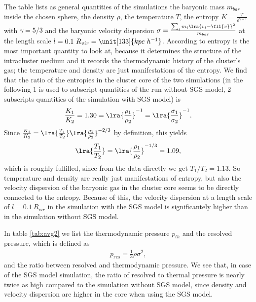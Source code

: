 The table lists as general quantities of the simulations the baryonic mass
$m_{bar}$ inside the chosen sphere, the density $\rho$, the temperature $T$, the
entropy $K=\frac{T}{\rho^{\gamma-1}}$ with $\gamma=5/3$ and the baryonic
velocity dispersion $\sigma= \frac{\sum_i m_i \lra{v_i -
\fil{v}}^2}{m_{bar}}$ at the length scale 
$l=0.1\ R_{vir}=\unit[133]{kpc\ h^{-1}}$. According to \citet{Voit2005} entropy
is the most important quantity to look at, because it determines
the structure of the intracluster medium and it records the thermodynamic
history of the cluster's gas; the temperature and density are just
manifestations of the entropy.
We find that the ratio of the entropies in the cluster core of the two
simulations (in the 
following 1 is used to subscript quantities of the run without SGS model, 2
subscripts quantities of the simulation with SGS model) is
\begin{align}
\frac{K_1}{K_2}=1.30 = \lra{\frac{\rho_1}{\rho_2}}^{-1}=
\lra{\frac{\sigma_1}{\sigma_2}}^{-1}.
\end{align}
Since $\frac{K_1}{K_2}=
\lra{\frac{T_1}{T_2}}\lra{\frac{\rho_1}{\rho_2}}^{-2/3}$ by definition, this
yields
\begin{align}
\lra{\frac{T_1}{T_2}}=\lra{\frac{\rho_1}{\rho_2}}^{-1/3}=1.09,
\end{align}
which is roughly fulfilled, since from the data directly
we get $T_1/T_2 = 1.13$. So temperature and density are really just
manifestations of entropy, but also the velocity dispersion of the baryonic
gas in the cluster core seems to be directly connected to the entropy.
Because of this, the velocity dispersion at a length scale of $l=0.1\ R_{vir}$
in
the simulation with the SGS model is significantely higher than in the
simulation without SGS model.

In table \ref{tab:avg2} we list the thermodynamic pressure $p_{th}$ and the
resolved pressure, which is defined as
\begin{align}
p_{res}=\frac{1}{3} \rho \sigma^2,
\end{align}
and the ratio between resolved and thermodynamic pressure. We see that, in 
case of the SGS model simulation, the ratio of resolved to thermal pressure
is nearly twice as high compared to the simulation without SGS model, since
density and velocity dispersion are higher in the core when using the SGS
model.

